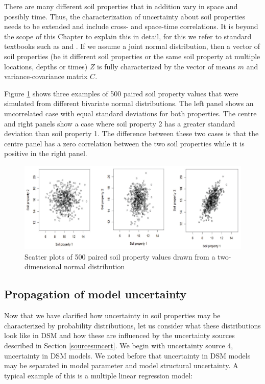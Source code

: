 \documentclass[10pt,b5paper,]{book}
\theoremstyle{definition}
\theoremstyle{definition}
\theoremstyle{definition}
\theoremstyle{remark}
\begin{document}
There are many different soil properties that in addition vary in space
and possibly time. Thus, the characterization of uncertainty about soil
properties needs to be extended and include cross- and space-time
correlations. It is beyond the scope of this Chapter to explain this in
detail, for this we refer to standard textbooks such as
\citet{goovaerts1997geostatistics} and \citet{webster_2007}. If we
assume a joint normal distribution, then a vector of soil properties (be
it different soil properties or the same soil property at multiple
locations, depths or times) \(Z\) is fully characterized by the vector
of means \(m\) and variance-covariance matrix \(C\).

Figure \ref{fig:pairedsoils} shows three examples of 500 paired soil
property values that were simulated from different bivariate normal
distributions. The left panel shows an uncorrelated case with equal
standard deviations for both properties. The centre and right panels
show a case where soil property 2 has a greater standard deviation than
soil property 1. The difference between these two cases is that the
centre panel has a zero correlation between the two soil properties
while it is positive in the right panel.

\begin{figure}

{\centering \includegraphics[width=0.8\linewidth]{images/pairedsoilpropierties} 

}

\caption{Scatter plots of 500 paired soil property values drawn from a two-dimensional normal distribution}\label{fig:pairedsoils}
\end{figure}

\hypertarget{propagation-of-model-uncertainty}{%
\subsection{Propagation of model
uncertainty}\label{propagation-of-model-uncertainty}}

Now that we have clarified how uncertainty in soil properties may be
characterized by probability distributions, let us consider what these
distributions look like in DSM and how these are influenced by the
uncertainty sources described in Section \ref{sourcesuncert}. We begin
with uncertainty source 4, uncertainty in DSM models. We noted before
that uncertainty in DSM models may be separated in model parameter and
model structural uncertainty. A typical example of this is a multiple
linear regression model:
\end{document}
